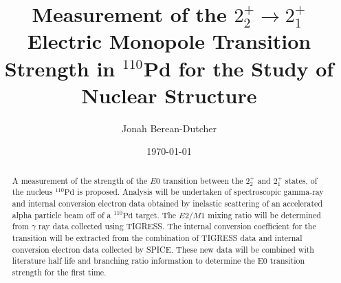 \documentclass[twocolumn,preprintnumbers,amsmath,amssymb]{revtex4}
\begin{document}
\title{Measurement of the $2^+_2 \rightarrow 2^+_1$ Electric Monopole Transition Strength in $^{110}$Pd for the Study of Nuclear Structure}

\author{Jonah Berean-Dutcher}

\date{\today}

\begin{abstract}


A measurement of the strength of the $E0$ transition between the $2^+_2$ and $2^+_1$ states, of the nucleus $^{110}\mathrm{Pd}$ is proposed. Analysis will be undertaken of spectroscopic gamma-ray and internal conversion electron data obtained by inelastic scattering of an accelerated alpha particle beam off of a $^{110}\mathrm{Pd}$ target. The $E2/M1$ mixing ratio will be determined from $\gamma$ ray data collected using TIGRESS. The internal conversion coefficient for the transition will be extracted from the combination of TIGRESS data and internal conversion electron data collected by SPICE. These new data will be combined with literature half life and branching ratio information to determine the E0 transition strength for the first time.

\end{abstract}

\maketitle
\end{document}
